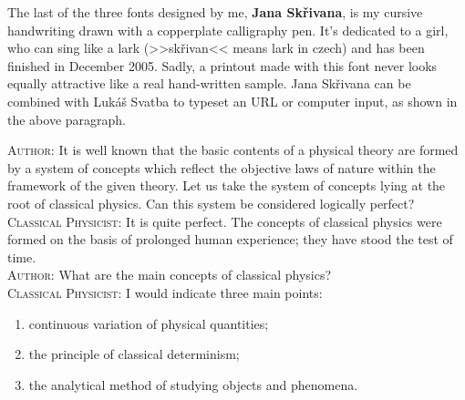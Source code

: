 \documentclass[a4paper,sfsidenotes,colorlinks=true]{tufte-book}
\numberwithin{equation}{section}
\numberwithin{figure}{section}
\begin{document}
{\fontsize{14pt}{16pt}\selectfont\Fontskrivan
The last of the three fonts designed by me, \textbf{Jana Sk\v rivana}, is my cursive handwriting drawn with a
copperplate calligraphy pen. It's dedicated to a girl, who can sing like a lark
(>>sk\v rivan<< means lark in czech) and has been finished in December 2005. Sadly, a printout made with this
font never looks equally attractive like a real hand-written sample. 
Jana Sk\v rivana can be combined with Luk\'a\v s Svatba to typeset an URL or computer input, 
as shown in the above paragraph.}

\textsc{Author:} It is well known that the basic contents of a physical theory are formed by a system of concepts which reflect the objective laws of nature within the framework of the given theory. Let us take the system of concepts lying at the root of classical physics. Can this system be considered logically perfect?
\\
\textsc{Classical Physicist:} It is quite perfect. The concepts of classical physics were formed on the basis of prolonged human experience; they have stood the test of time.
\\
\textsc{Author:} What are the main concepts of classical physics?
\\
\textsc{Classical Physicist:} I would indicate three main points: 

\begin{enumerate}[label=(\alph*),leftmargin=1.8cm]
\item continuous variation of physical quantities;
\item the principle of classical determinism; 
\item the analytical method of studying objects and phenomena. 
\end{enumerate}
\end{document}
